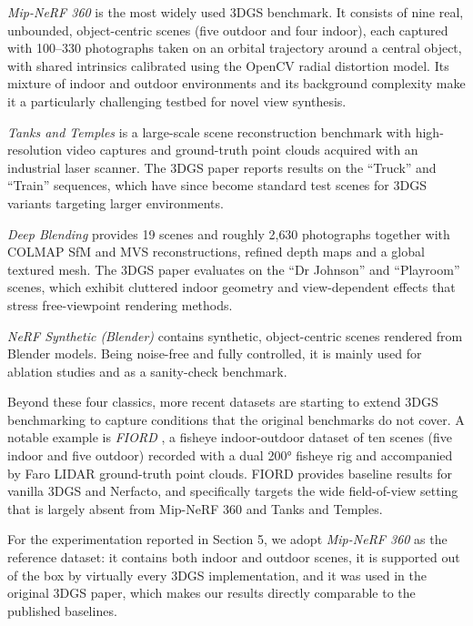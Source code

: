 \documentclass[
	a4paper, %
	10pt, %
	unnumberedsections, %
	twoside, %
]{LTJournalArticle}
\begin{document}
\textit{Mip-NeRF 360} \cite{barron2022mipnerf360} is the most widely used 3DGS benchmark. It consists of nine real, unbounded, object-centric scenes (five outdoor and four indoor), each captured with 100--330 photographs taken on an orbital trajectory around a central object, with shared intrinsics calibrated using the OpenCV radial distortion model. Its mixture of indoor and outdoor environments and its background complexity make it a particularly challenging testbed for novel view synthesis.

\textit{Tanks and Temples} \cite{knapitsch2017tanks} is a large-scale scene reconstruction benchmark with high-resolution video captures and ground-truth point clouds acquired with an industrial laser scanner. The 3DGS paper reports results on the ``Truck'' and ``Train'' sequences, which have since become standard test scenes for 3DGS variants targeting larger environments.

\textit{Deep Blending} \cite{hedman2018deepblending} provides 19 scenes and roughly 2{,}630 photographs together with COLMAP SfM and MVS reconstructions, refined depth maps and a global textured mesh. The 3DGS paper evaluates on the ``Dr Johnson'' and ``Playroom'' scenes, which exhibit cluttered indoor geometry and view-dependent effects that stress free-viewpoint rendering methods.

\textit{NeRF Synthetic (Blender)} \cite{mildenhall2020nerf} contains synthetic, object-centric scenes rendered from Blender models. Being noise-free and fully controlled, it is mainly used for ablation studies and as a sanity-check benchmark.

Beyond these four classics, more recent datasets are starting to extend 3DGS benchmarking to capture conditions that the original benchmarks do not cover. A notable example is \textit{FIORD} \cite{fiord2025}, a fisheye indoor-outdoor dataset of ten scenes (five indoor and five outdoor) recorded with a dual 200° fisheye rig and accompanied by Faro LIDAR ground-truth point clouds. FIORD provides baseline results for vanilla 3DGS and Nerfacto, and specifically targets the wide field-of-view setting that is largely absent from Mip-NeRF 360 and Tanks and Temples.

For the experimentation reported in Section 5, we adopt \textit{Mip-NeRF 360} as the reference dataset: it contains both indoor and outdoor scenes, it is supported out of the box by virtually every 3DGS implementation, and it was used in the original 3DGS paper, which makes our results directly comparable to the published baselines.
\end{document}
